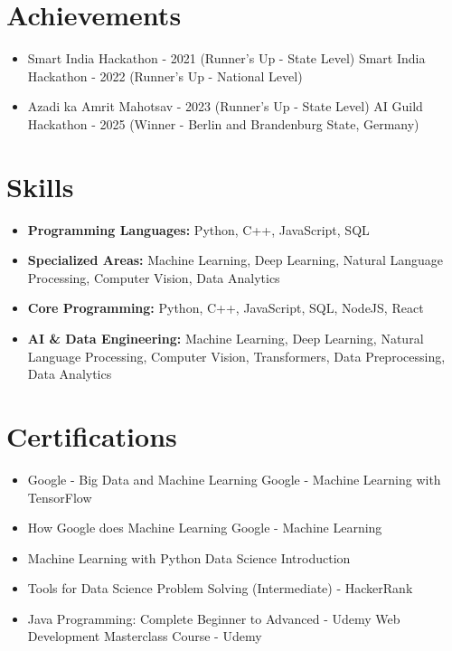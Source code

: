 \documentclass[a4paper,10pt]{article}
\begin{document}
\section*{Achievements}
\begin{itemize}
\item Smart India Hackathon - 2021 (Runner's Up - State Level) \hfill Smart India Hackathon - 2022 (Runner's Up - National Level)
\item Azadi ka Amrit Mahotsav - 2023 (Runner's Up - State Level) \hfill AI Guild Hackathon - 2025 (Winner - Berlin and Brandenburg State, Germany)
\end{itemize}

\section*{Skills}
\begin{itemize}
  \item \textbf{Programming Languages:} Python, C++, JavaScript, SQL
  \item \textbf{Specialized Areas:} Machine Learning, Deep Learning, Natural Language Processing, Computer Vision, Data Analytics
  \item \textbf{Core Programming:} Python, C++, JavaScript, SQL, NodeJS, React
  \item \textbf{AI \& Data Engineering:} Machine Learning, Deep Learning, Natural Language Processing, Computer Vision, Transformers, Data Preprocessing, Data Analytics
\end{itemize}

\section*{Certifications}
\begin{itemize}
\item Google - Big Data and Machine Learning \hfill Google - Machine Learning with TensorFlow
\item How Google does Machine Learning \hfill Google - Machine Learning
\item Machine Learning with Python \hfill Data Science Introduction
\item Tools for Data Science \hfill Problem Solving (Intermediate) - HackerRank
\item Java Programming: Complete Beginner to Advanced - Udemy \hfill Web Development Masterclass Course - Udemy
\end{itemize}
\end{document}
